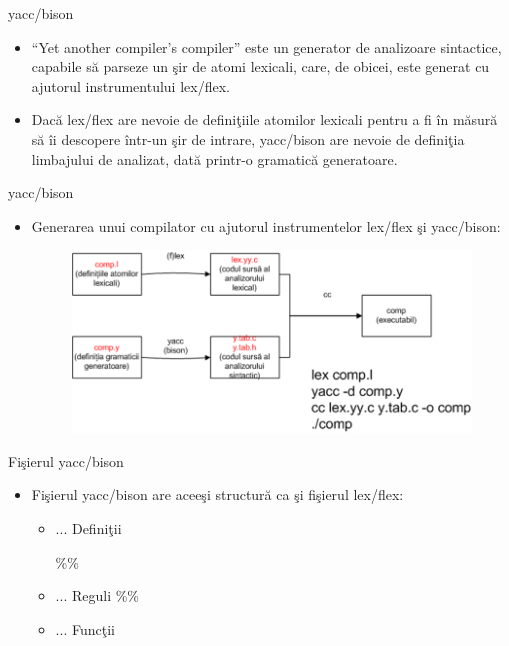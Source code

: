 \documentclass[pdf]{beamer}
\begin{document}
\begin{frame}{yacc/bison}
\begin{itemize}
	\item
	“Yet another compiler’s compiler” este un generator de analizoare sintactice, capabile să parseze un şir de atomi lexicali, care, de obicei, este generat cu ajutorul instrumentului lex/flex.

	\item
	Dacă lex/flex are nevoie de definiţiile atomilor lexicali pentru a fi în măsură să îi descopere într-un şir de intrare, yacc/bison are nevoie de definiţia limbajului de analizat, dată printr-o gramatică generatoare.
\end{itemize}
\end{frame}



\begin{frame}{yacc/bison}
\begin{itemize}
	\item
	Generarea unui compilator cu ajutorul instrumentelor lex/flex şi yacc/bison: 
		\linebreak

\begin{figure}
	\includegraphics[width=\linewidth]{imgYacc1.png}
  	\label{fig:schema1}
\end{figure}

\end{itemize}
\end{frame}



\begin{frame}{Fişierul yacc/bison}
\begin{itemize}
	\item
	Fişierul yacc/bison are aceeşi structură ca şi fişierul lex/flex:
		\linebreak

	\begin{itemize}
	    	\item
		... Definiţii
			\linebreak
	
		\%\%
		\item
		... Reguli
			\linebreak
		\%\%
			\linebreak
	
		\item
		... Funcţii
	\end{itemize}
\end{itemize}
\end{frame}
\end{document}
